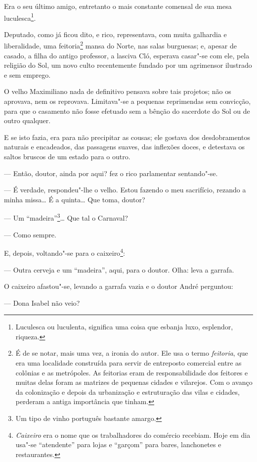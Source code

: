 Era o seu último amigo, entretanto o mais constante comensal de sua mesa
luculesca\footnote{Luculesca ou luculenta, significa uma coisa que
  esbanja luxo, esplendor, riqueza.}.

Deputado, como já ficou dito, e rico, representava, com muita galhardia
e liberalidade, uma feitoria\footnote{É de se notar, mais uma vez, a
  ironia do autor. Ele usa o termo \emph{feitoria}, que era uma
  localidade construída para servir de entreposto comercial entre as
  colônias e as metrópoles. As feitorias eram de responsabilidade dos
  feitores e muitas delas foram as matrizes de pequenas cidades e
  vilarejos. Com o avanço da colonização e depois da urbanização e
  estruturação das vilas e cidades, perderam a antiga importância que
  tinham.} mansa do Norte, nas salas burguesas; e, apesar de casado, a
filha do antigo professor, a lasciva Cló, esperava casar"-se com ele,
pela religião do Sol, um novo culto recentemente fundado por um
agrimensor ilustrado e sem emprego.

O velho Maximiliano nada de definitivo pensava sobre tais projetos; não
os aprovava, nem os reprovava. Limitava"-se a pequenas reprimendas sem
convicção, para que o casamento não fosse efetuado sem a bênção do
sacerdote do Sol ou de outro qualquer.

E se isto fazia, era para não precipitar as cousas; ele gostava dos
desdobramentos naturais e encadeados, das passagens suaves, das
inflexões doces, e detestava os saltos bruscos de um estado para o
outro.

--- Então, doutor, ainda por aqui? fez o rico parlamentar sentando"-se.

--- É verdade, respondeu"-lhe o velho. Estou fazendo o meu sacrifício,
rezando a minha missa\ldots{} É a quinta\ldots{} Que toma, doutor?

--- Um ``madeira''\footnote{Um tipo de vinho português bastante amargo.}\ldots{}
Que tal o Carnaval?

--- Como sempre.

E, depois, voltando"-se para o caixeiro\footnote{\emph{Caixeiro} era o
  nome que os trabalhadores do comércio recebiam. Hoje em dia usa"-se
  ``atendente'' para lojas e ``garçom'' para bares, lanchonetes e
  restaurantes.}:

--- Outra cerveja e um ``madeira'', aqui, para o doutor. Olha: leva a
garrafa.

O caixeiro afastou"-se, levando a garrafa vazia e o doutor André
perguntou:

--- Dona Isabel não veio?


